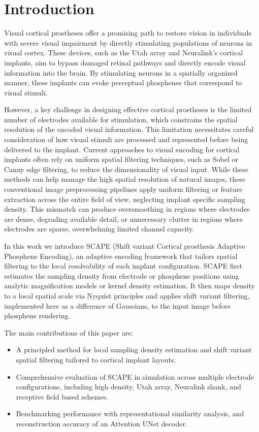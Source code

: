 \section{Introduction}
Visual cortical prostheses offer a promising path to restore vision in individuals with severe visual impairment by directly stimulating populations of neurons in visual cortex. These devices, such as the Utah array and Neuralink's cortical implants, aim to bypass damaged retinal pathways and directly encode visual information into the brain. By stimulating neurons in a spatially organized manner, these implants can evoke perceptual phosphenes that correspond to visual stimuli.

However, a key challenge in designing effective cortical prostheses is the limited number of electrodes available for stimulation, which constrains the spatial resolution of the encoded visual information. This limitation necessitates careful consideration of how visual stimuli are processed and represented before being delivered to the implant.
Current approaches to visual encoding for cortical implants often rely on uniform spatial filtering techniques, such as Sobel or Canny edge filtering, to reduce the dimensionality of visual input. While these methods can help manage the high spatial resolution of natural images, these conventional image preprocessing pipelines apply uniform filtering or feature extraction across the entire field of view, neglecting implant specific sampling density. This mismatch can produce oversmoothing in regions where electrodes are dense, degrading available detail, or unnecessary clutter in regions where electrodes are sparse, overwhelming limited channel capacity.

In this work we introduce SCAPE (Shift variant Cortical prosthesis Adaptive Phosphene Encoding), an adaptive encoding framework that tailors spatial filtering to the local resolvability of each implant configuration. SCAPE first estimates the sampling density from electrode or phosphene positions using analytic magnification models or kernel density estimation. It then maps density to a local spatial scale via Nyquist principles and applies shift variant filtering, implemented here as a difference of Gaussians, to the input image before phosphene rendering. 

The main contributions of this paper are:
\begin{itemize}
  \item A principled method for local sampling density estimation and shift variant spatial filtering tailored to cortical implant layouts.
  \item Comprehensive evaluation of SCAPE in simulation across multiple electrode configurations, including high density, Utah array, Neuralink shank, and receptive field based schemes.
  \item Benchmarking performance with representational similarity analysis, and reconstruction accuracy of an Attention UNet decoder.
\end{itemize}
